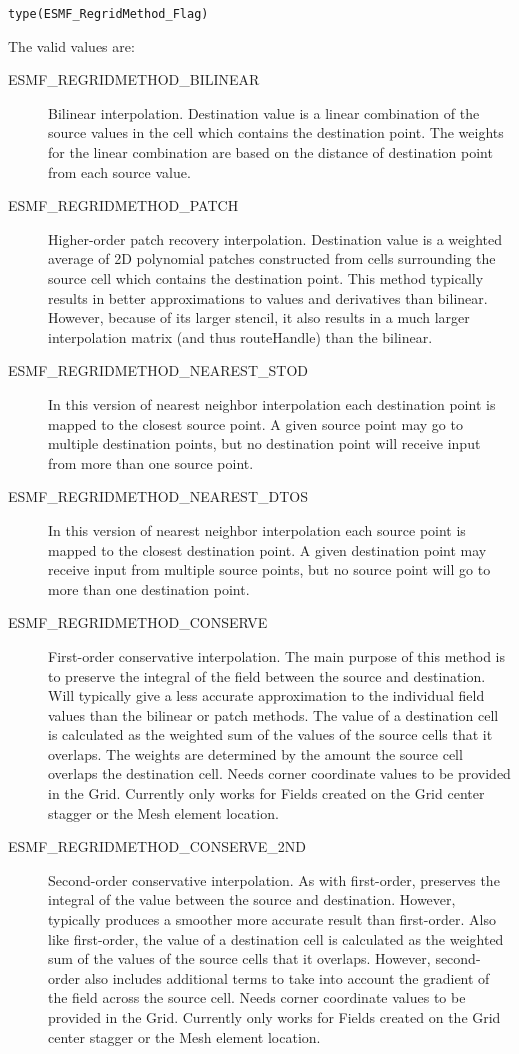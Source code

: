 {\tt type(ESMF\_RegridMethod\_Flag)}

The valid values are:
\begin{description}
\item [ESMF\_REGRIDMETHOD\_BILINEAR]
      Bilinear interpolation. Destination value is a linear combination of the source values in the cell which contains the destination point. The weights for the linear combination are based on the distance of destination point from each source value. 
\item [ESMF\_REGRIDMETHOD\_PATCH]
      Higher-order patch recovery interpolation. Destination value is a weighted average of 2D polynomial patches constructed from cells surrounding the source cell which contains the destination point. This method typically results in better approximations to values and derivatives than bilinear. However, because of its larger stencil, it also results in a much larger interpolation matrix (and thus routeHandle) than the bilinear. 
\item [ESMF\_REGRIDMETHOD\_NEAREST\_STOD]
      In this version of nearest neighbor interpolation each destination point is mapped to the closest source point. A given source point may go to multiple destination points, but no destination point will receive input from more than one source point. 
\item [ESMF\_REGRIDMETHOD\_NEAREST\_DTOS]
      In this version of nearest neighbor interpolation each source point is mapped to the closest destination point. A given destination point may receive input from multiple source points, but no source point will go to more than one destination point. 
\item [ESMF\_REGRIDMETHOD\_CONSERVE]
      First-order conservative interpolation. The main purpose of this method is to preserve the integral of the field between the source and destination. 
      Will typically give a less accurate approximation to the individual field values than the bilinear or patch methods. The value of a destination cell is calculated as the weighted sum of the values of the source cells that it overlaps. The weights are determined by the amount the source cell overlaps the destination cell. Needs corner coordinate values to be provided in the Grid. Currently only works for Fields created on the Grid center stagger or the Mesh element location. 
\item [ESMF\_REGRIDMETHOD\_CONSERVE\_2ND]
      Second-order conservative interpolation. As with first-order, preserves the integral of the value between the source and destination. However, typically produces a smoother more accurate result than first-order. Also like first-order, the value of a destination cell is calculated as the weighted sum of the values of the source cells that it overlaps. However, second-order also includes additional terms to take into account the gradient of the field across the source cell. Needs corner coordinate values to be provided in the Grid. Currently only works for Fields created on the Grid center stagger or the Mesh element location. 


\end{description}



